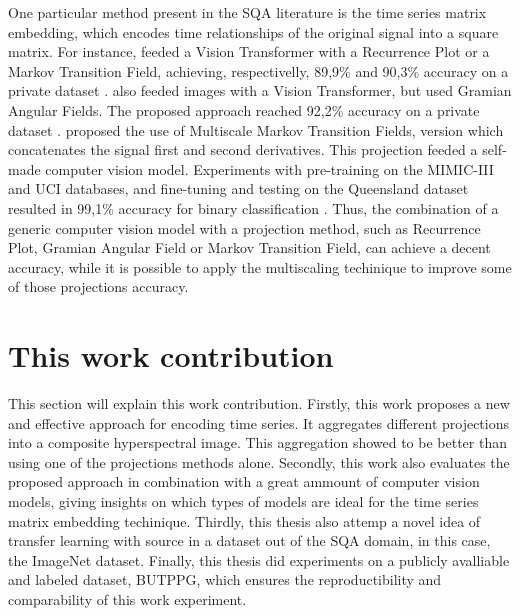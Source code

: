 One particular method present in the \acrshort{SQA} literature is the time series matrix embedding, which encodes time relationships of the original signal into a square matrix. For instance, \citeauthor{review-16} feeded a Vision Transformer with a Recurrence Plot or a Markov Transition Field, achieving, respectivelly, 89,9\% and 90,3\% accuracy on a private dataset \cite{review-16}. \citeauthor{review-17} also feeded images with a Vision Transformer, but used Gramian Angular Fields. The proposed approach reached 92,2\% accuracy on a private dataset \cite{review-17}. \citeauthor{review-18} proposed the use of Multiscale Markov Transition Fields, version which concatenates the signal first and second derivatives. This projection feeded a self-made computer vision model. Experiments with pre-training on the MIMIC-III and UCI databases, and fine-tuning and testing on the Queensland dataset resulted in 99,1\% accuracy for binary classification \cite{review-18}. Thus, the combination of a generic computer vision model with a projection method, such as Recurrence Plot, Gramian Angular Field or Markov Transition Field, can achieve a decent accuracy, while it is possible to apply the multiscaling techinique to improve some of those projections accuracy. 

\section{This work contribution}
\label{sec:my_work}

This section will explain this work contribution. Firstly, this work proposes a new and effective approach for encoding time series. It aggregates different projections into a composite hyperspectral image. This aggregation showed to be better than using one of the projections methods alone. Secondly, this work also evaluates the proposed approach in combination with a great ammount of computer vision models, giving insights on which types of models are ideal for the time series matrix embedding techinique. Thirdly, this thesis also attemp a novel idea of transfer learning with source in a dataset out of the \acrshort{SQA} domain, in this case, the ImageNet dataset. Finally, this thesis did experiments on a publicly avalliable and labeled dataset, \acrfull{BUTPPG}, which ensures the reproductibility and comparability of this work experiment.  
